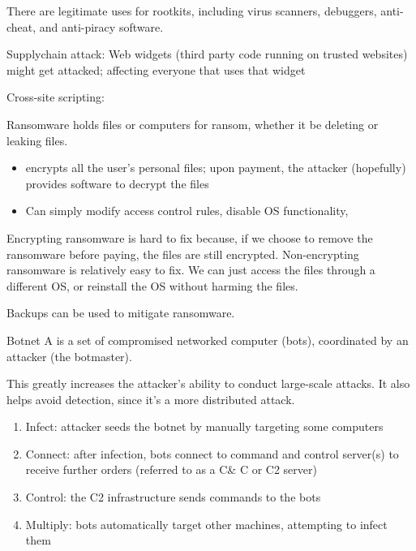 There are legitimate uses for rootkits, including virus scanners, debuggers, anti-cheat, and anti-piracy software.


Supplychain attack: Web widgets (third party code running on trusted websites) might get attacked; affecting everyone that uses that widget

Cross-site scripting: 

\begin{dfnbox}{Ransomware}{}
     holds files or computers for ransom, whether it be deleting or leaking files.
\end{dfnbox}

\begin{itemize}
    \item {} encrypts all the user's personal files; upon payment, the attacker (hopefully) provides software to decrypt the files
    \item {} Can simply modify access control rules, disable OS functionality,
\end{itemize}

Encrypting ransomware is hard to fix because, if we choose to remove the ransomware before paying, the files are still encrypted. Non-encrypting ransomware is relatively easy to fix. We can just access the files through a different OS, or reinstall the OS without harming the files.

Backups can be used to mitigate ransomware.

\begin{dfnbox}{Botnet}{}
    A  is a set of compromised networked computer (bots), coordinated by an attacker (the botmaster).
\end{dfnbox}

This greatly increases the attacker's ability to conduct large-scale attacks. It also helps avoid detection, since it's a more distributed attack.

\begin{enumerate}
    \item Infect: attacker seeds the botnet by manually targeting some computers
    \item Connect: after infection, bots connect to command and control server(s) to receive further orders (referred to as a C\& C or C2 server)
    \item Control: the C2 infrastructure sends commands to the bots
    \item Multiply: bots automatically target other machines, attempting to infect them
\end{enumerate}

